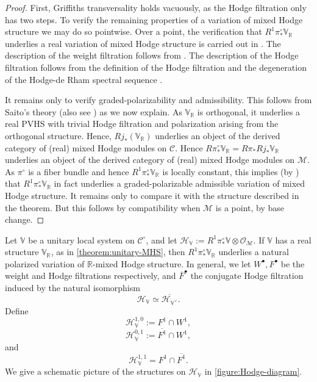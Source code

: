 \begin{proof}
First, Griffiths transversality holds vacuously, as the Hodge filtration only has two steps.
To verify the remaining properties of a variation of mixed Hodge structure
we may do so pointwise.
Over a point,
the verification that
$R^1\pi^\circ_*\mathbb{V}_\mathbb{R}$ underlies a real variation of mixed Hodge
structure is carried out in
\cite[Theorem, p. 152]{timmerscheidt:mixed-hodge-structure-for-unitary}.
The description of the weight filtration follows from \cite[Lemma
6.2]{timmerscheidt:mixed-hodge-structure-for-unitary}.
The description of the Hodge filtration follows from the definition of the
Hodge filtration and the degeneration of the Hodge-de Rham spectral sequence
\cite[Theorem 7.1(a)]{timmerscheidt:mixed-hodge-structure-for-unitary}.

It remains only to verify graded-polarizability and admissibility. This follows from Saito's theory \cite{saito1990mixed} (also see
\cite{schnell2014overview}) as we now explain.
As $\mathbb{V}_\mathbb{R}$ is orthogonal, it underlies a real PVHS with trivial Hodge filtration and polarization arising from the orthogonal structure.
Hence, $Rj_*(\mathbb{V}_\mathbb{R})$ underlies an
object of the derived category of (real) mixed Hodge modules on $\mathscr{C}$. Hence
$R\pi^\circ_*\mathbb{V}_\mathbb{R}=R\pi_*Rj_*\mathbb{V}_\mathbb{R}$
underlies an object of the derived category of (real) mixed Hodge
modules on $\mathscr{M}$. As $\pi^\circ$ is a fiber bundle and hence $R^1\pi^\circ_*\mathbb{V}_\mathbb{R}$ is locally constant, this implies (by \cite[Theorem 21.1]{schnell2014overview}) that
$R^1\pi^\circ_*\mathbb{V}_\mathbb{R}$ in fact underlies a graded-polarizable
admissible variation of mixed Hodge structure. It remains only to compare it with
the structure described in the theorem. But this follows by compatibility
when $\mathscr{M}$ is a point, by base change.
\end{proof}
Let $\mathbb{V}$ be a unitary local system on $\mathscr{C}^\circ$, and let $\mathscr{H}_\mathbb{V}:=R^1\pi^\circ_*\mathbb{V}\otimes \mathscr{O}_\mathscr{M}$.   If $\mathbb{V}$ has a real structure $\mathbb{V}_\mathbb{R}$, as in \autoref{theorem:unitary-MHS}, then  $R^1\pi_*^\circ \mathbb{V}_\mathbb{R}$ underlies a natural polarized variation of $\mathbb{R}$-mixed Hodge structure. In general, we let $W^\bullet, F^\bullet$ be the weight and Hodge filtrations respectively, and $\overline{F}^\bullet$ the conjugate Hodge filtration induced by the natural isomorphism $$\mathscr{H}_{\mathbb{V}}\simeq \overline{\mathscr{H}_{\mathbb{V}^\vee}}.$$ Define $$\mathscr{H}_{\mathbb{V}}^{1,0}:= F^1\cap W^1,$$ $$\mathscr{H}^{0,1}_{\mathbb{V}} := \overline{F^1}\cap W^1,$$ and $$\mathscr{H}^{1,1}_{\mathbb{V}}=F^1\cap \overline{F^1}.$$
We give a schematic picture of the structures on $\mathscr{H}_{\mathbb{V}}$ in \autoref{figure:Hodge-diagram}.


